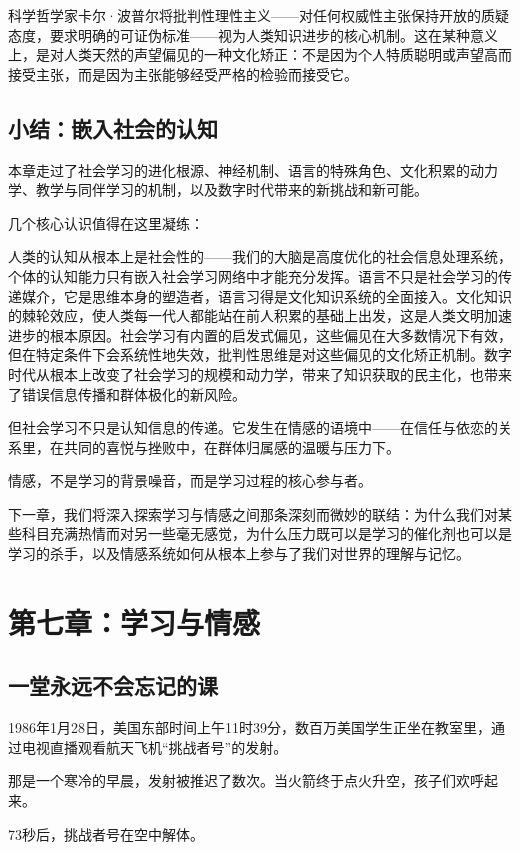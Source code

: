 \documentclass[11pt]{article}
\begin{document}
科学哲学家卡尔·波普尔将批判性理性主义——对任何权威性主张保持开放的质疑态度，要求明确的可证伪标准——视为人类知识进步的核心机制。这在某种意义上，是对人类天然的声望偏见的一种文化矫正：不是因为个人特质聪明或声望高而接受主张，而是因为主张能够经受严格的检验而接受它。
\subsection{小结：嵌入社会的认知}
\label{sec:org84e2850}

本章走过了社会学习的进化根源、神经机制、语言的特殊角色、文化积累的动力学、教学与同伴学习的机制，以及数字时代带来的新挑战和新可能。

几个核心认识值得在这里凝练：

人类的认知从根本上是社会性的——我们的大脑是高度优化的社会信息处理系统，个体的认知能力只有嵌入社会学习网络中才能充分发挥。语言不只是社会学习的传递媒介，它是思维本身的塑造者，语言习得是文化知识系统的全面接入。文化知识的棘轮效应，使人类每一代人都能站在前人积累的基础上出发，这是人类文明加速进步的根本原因。社会学习有内置的启发式偏见，这些偏见在大多数情况下有效，但在特定条件下会系统性地失效，批判性思维是对这些偏见的文化矫正机制。数字时代从根本上改变了社会学习的规模和动力学，带来了知识获取的民主化，也带来了错误信息传播和群体极化的新风险。

但社会学习不只是认知信息的传递。它发生在情感的语境中——在信任与依恋的关系里，在共同的喜悦与挫败中，在群体归属感的温暖与压力下。

情感，不是学习的背景噪音，而是学习过程的核心参与者。

下一章，我们将深入探索学习与情感之间那条深刻而微妙的联结：为什么我们对某些科目充满热情而对另一些毫无感觉，为什么压力既可以是学习的催化剂也可以是学习的杀手，以及情感系统如何从根本上参与了我们对世界的理解与记忆。
\section{第七章：学习与情感}
\label{sec:org5e2789a}

\subsection{一堂永远不会忘记的课}
\label{sec:orgcf14518}

1986年1月28日，美国东部时间上午11时39分，数百万美国学生正坐在教室里，通过电视直播观看航天飞机“挑战者号”的发射。

那是一个寒冷的早晨，发射被推迟了数次。当火箭终于点火升空，孩子们欢呼起来。

73秒后，挑战者号在空中解体。
\end{document}
